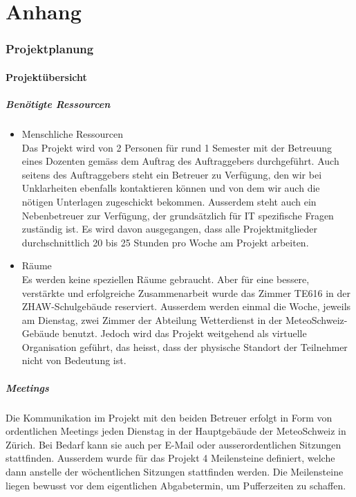 \documentclass[a4paper,10pt]{article}
\begin{document}



\part{Anhang}

\section{Projektplanung}

\subsection{Projektübersicht}

\subsubsection{Benötigte Ressourcen}
\begin{itemize}
\item Menschliche Ressourcen \\
Das Projekt wird von 2 Personen für rund 1 Semester mit der Betreuung
eines Dozenten gemäss dem Auftrag des Auftraggebers durchgeführt. Auch
seitens des Auftraggebers steht ein Betreuer zu Verfügung, den wir bei
Unklarheiten ebenfalls kontaktieren können und von dem wir auch die
nötigen Unterlagen zugeschickt bekommen. Ausserdem steht auch ein
Nebenbetreuer zur Verfügung, der grundsätzlich für IT spezifische Fragen
zuständig ist. Es wird davon ausgegangen, dass alle Projektmitglieder
durchschnittlich 20 bis 25 Stunden pro Woche am Projekt arbeiten.

\item Räume \\
Es werden keine speziellen Räume gebraucht. Aber für eine bessere,
verstärkte und erfolgreiche Zusammenarbeit wurde das Zimmer TE616 in der
ZHAW-Schulgebäude reserviert. Ausserdem werden einmal die Woche, jeweils
am Dienstag, zwei Zimmer der Abteilung Wetterdienst in der
MeteoSchweiz-Gebäude benutzt. Jedoch wird das Projekt weitgehend als
virtuelle Organisation geführt, das heisst, dass der physische Standort
der Teilnehmer nicht von Bedeutung ist.

\end{itemize}

\subsubsection{Meetings}
Die Kommunikation im Projekt mit den beiden Betreuer erfolgt in Form von ordentlichen Meetings jeden Dienstag in der Hauptgebäude der MeteoSchweiz in Zürich. Bei Bedarf kann sie auch per E-Mail oder ausserordentlichen Sitzungen stattfinden. Ausserdem wurde für das Projekt 4 Meilensteine definiert, welche dann anstelle der wöchentlichen Sitzungen stattfinden werden. Die Meilensteine liegen bewusst vor dem eigentlichen Abgabetermin, um Pufferzeiten zu schaffen.
\end{document}
